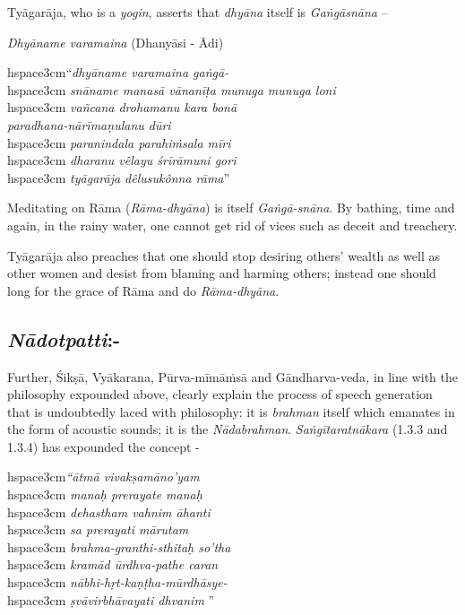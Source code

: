 Tyāgarāja, who is a \textit{yogin}, asserts that \textit{dhyāna} itself is \textit{Gaṅgāsnāna} –

\textit{Dhyāname varamaina} (Dhanyāsi - Ādi)

\begin{myquote}
hspace{3cm}“\textit{dhyāname varamaina gaṅgā-}\\hspace{3cm} \textit{snāname manasā vānanīṭa munuga munuga loni} \\hspace{3cm} \textit{vañcana drohamanu kara bonā}\\\textit{paradhana-nārīmaṇulanu dūri}\\hspace{3cm} \textit{paranindala parahiṁsala mīri}\\hspace{3cm} \textit{dharanu vêlayu śrīrāmuni gori}\\hspace{3cm} \textit{tyāgarāja dêlusukônna rāma}”
\end{myquote}

Meditating on Rāma (\textit{Rāma-dhyāna}) is itself \textit{Gaṅgā-snāna}. By bathing, time and again, in the rainy water, one cannot get rid of vices such as deceit and treachery. 

Tyāgarāja also preaches that one should stop desiring others’ wealth as well as other women and desist from blaming and harming others; instead one should long for the grace of Rāma and do \textit{Rāma-dhyāna}.

\vspace{-.3cm}

\subsection*{\textit{Nādotpatti}:-}

Further, Śikṣā, Vyākarana, Pūrva-mīmāṁsā and Gāndharva-veda\textit{,} in line with the philosophy expounded above, clearly explain the process of speech generation that is undoubtedly laced with philosophy: it is \textit{brahman} itself which emanates in the form of acoustic sounds; it is the \textit{Nādabrahman}. \textit{Saṅgītaratnākara} (1.3.3 and 1.3.4) has expounded the concept -

\begin{myquote}
hspace{3cm}\textit{“ātmā vivakṣamāno’yam}\\hspace{3cm} \textit{manaḥ prerayate manaḥ} \\hspace{3cm} \textit{dehastham vahnim āhanti}\\hspace{3cm} \textit{sa prerayati mārutam} \\hspace{3cm} \textit{brahma-granthi-sthitaḥ so’tha}\\hspace{3cm} \textit{kramād ūrdhva-pathe caran} \\hspace{3cm} \textit{nābhi-hṛt-kaṇṭha-mūrdhāsye-}\\hspace{3cm} \textit{ṣvāvirbhāvayati dhvanim} ”
\end{myquote}

